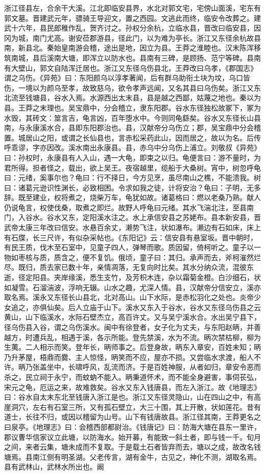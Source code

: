 \documentclass[12pt,UTF8]{ctexbook}
\begin{document}
浙江径县左，合余干大溪。江北即临安县界，水北对郭文宅，宅傍山面溪，宅东有郭文墓。晋建武元年，骠骑王导迎文，置之西园。文逃此而终，临安令改葬之。建武十六年，县民郎稚作乱，贺齐讨之。孙权分余杭，立临水县，晋改曰临安县，因冈为城，南门尤高。谢安莅郡游县，径此门，以为难为亭长。浙江又东径余杭故县南，新县北。秦始皇南游会稽，途出是地，因立为县。王莽之淮睦也。汉末陈浑移筑南城，县后溪南大塘，即浑立以防水也。县南有三碑，是顾扬、范宁等碑。县南有大壁山，郭文自陆浑迁居也。浙江又东径乌伤县北，王莽改曰乌孝，《郡国志》谓之乌伤。《异苑》曰：东阳颜乌以淳孝著闻，后有群乌助衔土块为坟，乌口皆伤，一境以为颜乌至孝，故致慈乌，欲令孝声远闻，又名其县曰乌伤矣。浙江又东北流至钱塘县，谷水入焉。水源西出太末县，县是越之西鄙，姑蔑之地也。秦以为县。王莽之末理也。吴宝鼎中，分会稽立，隶东阳郡。谷水东径独松故冢下，冢为水毁，其砖文：筮言吉，龟言凶，百年堕水中。今则同龟繇矣。谷水又东径长山县南，与永康溪水合，县即东阳郡治也。县，汉献帝分乌伤立；郡，吴宝鼎中分会稽置。城居山之阳，或谓之长仙县也，言赤松采药此山，因而居之，故以为名。后传呼乖谬，字亦因改。溪水南出永康县。县，赤乌中分乌伤上浦立。刘敬叔《异苑》曰：孙权时，永康县有人入山，遇一大龟，即束之以归。龟便言曰：游不量时，为君所得。担者怪之，载出，欲上吴王。夜宿越里，缆船于大桑树。宵中，树忽呼龟曰：元绪，奚事尔也？龟曰：行不择日，今方见烹，虽尽南山之樵，不能溃我。树曰：诸葛元逊识性渊长，必致相困。令求如我之徒，计将安治？龟曰：子明，无多辞。既至建业，权将煮之，烧柴万车，龟犹如故。诸葛格曰：燃以老桑乃熟。献人仍说龟言，权使伐桑，取煮之即烂。故野人呼龟曰元绪。其水飞湍北注，至县南门，入谷水。谷水又东，定阳溪水注之。水上承信安县之苏姥布。县本新安县，晋武帝太康三年改曰信安。水悬百余丈，濑势飞注，状如瀑布。濑边有石如床，床上有石牒，长三尺许，有似杂采帖也。《东阳记》云：信安县有悬室坂。晋中朝时，有民王质，伐木至石室中，见童子四人，弹琴而歌。质因留，倚柯听之。童子以一物如枣核与质，质含之，便不复饥。俄顷，童子曰：其归。承声而去，斧柯漼然烂尽。既归，质去家已数十年，亲情凋落，无复向时比矣。其水分纳众流，混彼东逝，径定阳县。夹岸缘溪，悉生支竹，及芳枳木连，杂以霜菊金橙。白沙细石，状如凝雪。石溜湍波，浮响无辍。山水之趣，尤深人情。县，汉献帝分信安立，溪亦取名焉。溪永又东径长山县北，北对高山。山下水际，是赤松羽化之处也。炎帝少女追之，亦俱仙矣。后人立庙于山下。溪水又东入于谷水，谷水又东径乌伤县之云黄山，山下临溪水，水际石壁杰立，高百许丈。又与吴宁溪水合。水出吴宁县下，径乌伤县入谷，谓之乌伤溪水。闽中有徐登者，女子化为丈夫，与东阳赵昞，并善越方，时遭兵乱，相遇于溪，各示所能。登先禁溪，水为不流。昞次禁枯柳，柳为生荑。二人相示而笑。登年长，昞师事之。后登身故，昞东入章安，百姓未知；昞乃升茅屋，梧鼎而爨、主人惊怪，昞笑而不应，屋亦不损。又尝临水求渡，船人不许。昞乃张盖坐中，长啸呼风，乱流而济。于是百姓神服，从者如归，章安令恶而杀之，民立祠于永宁，而蚊蚋不能入。昞秉道怀术，而不能全身避害，事伺苌弘，宋元之龟，厄运之来，故难救矣。谷水又东入钱唐县，而左入浙江。故《地理志》曰：谷水自太末东北至钱唐入浙江是也。浙江又东径灵隐山，山在四山之中，有高崖洞穴，左右有石室三所，又有孤石壁立，大三十围，其上开散，状如莲花。昔有道士，长往不归，或因以稽留为山号。山下有钱唐故县。浙江径其南，王莽更名之曰泉亭。《地理志》曰：会稽西部都尉治。《钱唐记》曰：防海大塘在县东一里许，郡议曹华信家议立此塘，以防海水。始开募，有能致一斜土者，即与钱一千。旬月之间，来者云集，塘未成而不复取。于是载土石者皆弃而去，塘以之成，故改名钱塘焉。县南江侧有明圣湖。父老传言，湖有金牛，古见之，神化不测，湖取名焉。县有武林山，武林水所出也。阚
\end{document}
